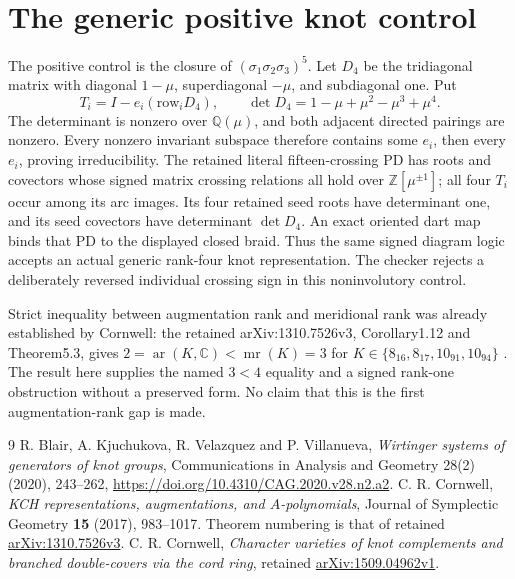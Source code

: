 \documentclass[11pt]{article}
\begin{document}
\section*{The generic positive knot control}
The positive control is the closure of $(\sigma_1\sigma_2\sigma_3)^5$.
Let $D_4$ be the tridiagonal matrix with diagonal $1-\mu$,
superdiagonal $-\mu$, and subdiagonal one. Put
\[
 T_i=I-e_i(\text{row}_iD_4),\qquad
 \det D_4=1-\mu+\mu^2-\mu^3+\mu^4.
\]
The determinant is nonzero over $\mathbb Q(\mu)$, and both adjacent
directed pairings are nonzero. Every nonzero invariant subspace
therefore contains some $e_i$, then every $e_i$, proving irreducibility.
The retained literal fifteen-crossing PD has roots and covectors whose
signed matrix crossing relations all hold over $\mathbb Z[\mu^{\pm1}]$;
all four $T_i$ occur among its arc images. Its four retained seed roots
have determinant one, and its seed covectors have determinant $\det D_4$.
An exact oriented dart map binds that PD to the displayed closed braid.
Thus the same signed diagram logic accepts an actual generic rank-four
knot representation. The checker rejects a deliberately reversed
individual crossing sign in this noninvolutory control.

Strict inequality between augmentation rank and meridional rank was
already established by Cornwell: the retained arXiv:1310.7526v3,
Corollary1.12 and Theorem5.3, gives
$2=\operatorname{ar}(K,\mathbb C)<\operatorname{mr}(K)=3$ for
$K\in\{8_{16},8_{17},10_{91},10_{94}\}$ \cite{cornwell17}.
The result here supplies the named $3<4$ equality and a signed
rank-one obstruction without a preserved form. No claim that this is
the first augmentation-rank gap is made.

\begin{thebibliography}{9}
R. Blair, A. Kjuchukova, R. Velazquez and P. Villanueva,
\emph{Wirtinger systems of generators of knot groups},
Communications in Analysis and Geometry 28(2) (2020), 243--262,
\url{https://doi.org/10.4310/CAG.2020.v28.n2.a2}.
C. R. Cornwell, \emph{KCH representations, augmentations, and
$A$-polynomials}, Journal of Symplectic Geometry \textbf{15} (2017), 983--1017.
Theorem numbering is that of retained
\href{https://arxiv.org/abs/1310.7526v3}{arXiv:1310.7526v3}.
C. R. Cornwell, \emph{Character varieties of knot complements and
branched double-covers via the cord ring}, retained
\href{https://arxiv.org/abs/1509.04962v1}{arXiv:1509.04962v1}.
\end{thebibliography}
\end{document}
